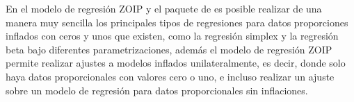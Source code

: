 En el modelo de regresi\'{o}n ZOIP y el paquete  de  es posible realizar de una manera muy sencilla los principales tipos de regresiones para datos proporciones inflados con ceros y unos que existen, como la regresi\'{o}n simplex y la regresi\'{o}n beta bajo diferentes parametrizaciones, adem\'{a}s el modelo de regresi\'{o}n ZOIP permite realizar ajustes a modelos inflados unilateralmente, es decir, donde solo haya datos proporcionales con valores cero o uno, e incluso realizar un ajuste sobre un modelo de regresi\'{o}n para datos proporcionales sin inflaciones.


